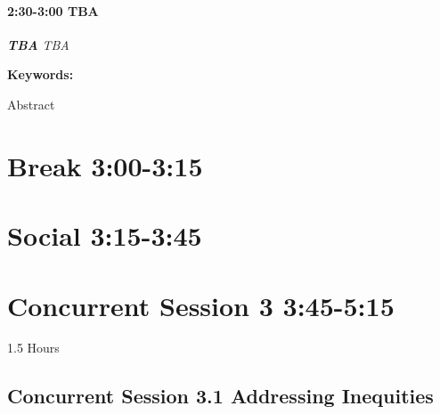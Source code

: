 \documentclass[
]{book}
\begin{document}
\begin{session}
\hypertarget{tba}{%
\paragraph*{\texorpdfstring{2:30-3:00 \textbar{} \textbf{TBA}
\textbar{}}{2:30-3:00 \textbar{} TBA \textbar{}}}\label{tba}}

\textbf{\emph{TBA}} \textbar{} \emph{TBA}

\textbf{Keywords:}

Abstract
\end{session}

\hypertarget{break-300-315}{%
\section*{Break \textbar{} 3:00-3:15}\label{break-300-315}}

\hypertarget{social-315-345}{%
\section*{Social \textbar{} 3:15-3:45}\label{social-315-345}}

\hypertarget{concurrent-session-3-345-515}{%
\section*{Concurrent Session 3 \textbar{} 3:45-5:15}\label{concurrent-session-3-345-515}}

1.5 Hours

\hypertarget{concurrent-session-3.1-addressing-inequities}{%
\subsection*{Concurrent Session 3.1 \textbar{} Addressing Inequities}\label{concurrent-session-3.1-addressing-inequities}}
\end{document}

